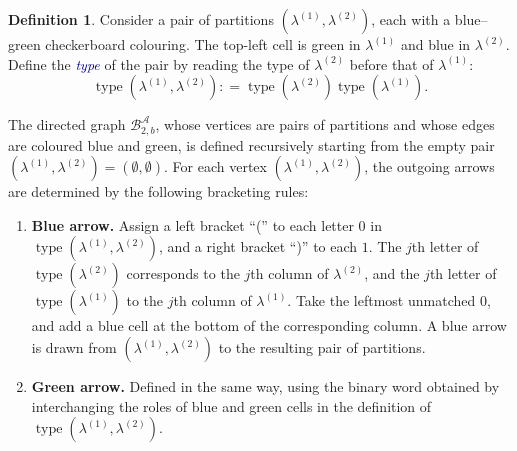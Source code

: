 \documentclass[11pt]{article}
\theoremstyle{definition}
\newtheorem{definition}[theorem]{Definition}
\theoremstyle{remark}
\theoremstyle{definition}
\numberwithin{equation}{section}
\newcommand{\type}{\operatorname{type}}
\newcommand{\coloneq}{\mathrel{\mathop:}=}
\renewcommand\emph[1]{\textcolor{darkblue}{\it #1}}
\begin{document}
\begin{definition}\label{def:pairs_crystal}
  Consider a pair of partitions \( (\lambda^{(1)}, \lambda^{(2)}) \),
  each with a blue--green checkerboard colouring. The top-left cell is
  green in \( \lambda^{(1)} \) and blue in \( \lambda^{(2)} \). Define
  the \emph{type} of the pair by reading the type of
  \( \lambda^{(2)} \) before that of \( \lambda^{(1)} \):
  \[
    \type(\lambda^{(1)}, \lambda^{(2)}) \coloneq \type(\lambda^{(2)})\type(\lambda^{(1)}).
  \]
  
  The directed graph \( \mathcal{B}_{2,b}^{\mathcal{A}} \), whose
  vertices are pairs of partitions and whose edges are coloured blue
  and green, is defined recursively starting from the empty pair
  \( (\lambda^{(1)},\lambda^{(2)}) = (\emptyset,\emptyset) \). For each vertex
  \( (\lambda^{(1)},\lambda^{(2)}) \), the outgoing arrows are determined by
  the following bracketing rules:
\begin{enumerate}
\item \textbf{Blue arrow.} Assign a left bracket ``('' to each letter
  \( 0 \) in \( \type(\lambda^{(1)}, \lambda^{(2)}) \), and a right bracket
  ``)'' to each \( 1 \). The \( j \)th letter of \( \type(\lambda^{(2)}) \)
  corresponds to the \( j \)th column of \( \lambda^{(2)} \), and the
  \( j \)th letter of \( \type(\lambda^{(1)}) \) to the \( j \)th column
  of \( \lambda^{(1)} \). Take the leftmost unmatched \( 0 \), and add
  a blue cell at the bottom of the corresponding column. A blue arrow is drawn from \( (\lambda^{(1)}, \lambda^{(2)}) \) to the resulting pair of partitions.
\item \textbf{Green arrow.} Defined in the same way, using the binary
  word obtained by interchanging the roles of blue and green cells in
  the definition of \( \type(\lambda^{(1)}, \lambda^{(2)}) \).
\end{enumerate}
\end{definition}
\end{document}
